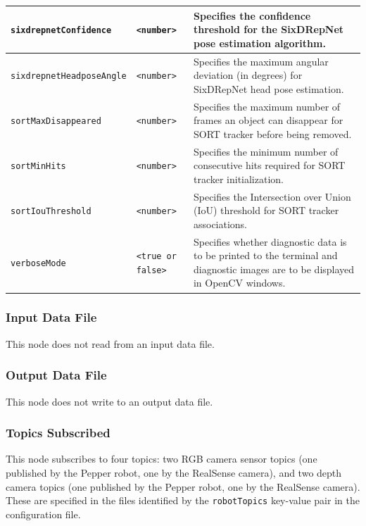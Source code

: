 \documentclass{CSSRforAfrica}
\begin{document}
{\begin{center}
\begin{tabularx}{\linewidth}{| l | l | X|}
\hline
{\footnotesize \texttt{sixdrepnetConfidence} }  & {\footnotesize \texttt{<number>}}     & {\small Specifies the confidence threshold for the SixDRepNet pose estimation algorithm.} \\
\hline
{\footnotesize \texttt{sixdrepnetHeadposeAngle} }  & {\footnotesize \texttt{<number>}}     & {\small Specifies the maximum angular deviation (in degrees) for SixDRepNet head pose estimation.} \\
\hline
{\footnotesize \texttt{sortMaxDisappeared}}  & {\footnotesize \texttt{<number>}}     & {\small Specifies the maximum number of frames an object can disappear for SORT tracker before being removed.} \\
\hline
{\footnotesize \texttt{sortMinHits}}  & {\footnotesize \texttt{<number>}}     & {\small Specifies the minimum number of consecutive hits required for SORT tracker initialization.} \\
\hline
{\footnotesize \texttt{sortIouThreshold}}  & {\footnotesize \texttt{<number>}}     & {\small Specifies the Intersection over Union (IoU) threshold for SORT tracker associations.} \\
\hline
{\footnotesize \texttt{verboseMode}}  & {\footnotesize \texttt{<true or false>}}     & {\small Specifies whether diagnostic data is to be printed to the terminal and diagnostic images are to be displayed in OpenCV windows.} \\
\hline
\end{tabularx}
\end{center}


\subsubsection*{Input Data File}
This node does not read from an input data file.


\subsubsection*{Output Data File}
This node does not write to an output data file.

\subsubsection*{Topics Subscribed}

This node subscribes to four topics: two RGB camera sensor topics (one published by the Pepper robot, one by the RealSense camera), and two depth camera topics (one published by the Pepper robot, one by the RealSense camera).
These are specified in the files identified by the {\small \verb+robotTopics+ }  key-value pair in the configuration file.

}
\end{document}
